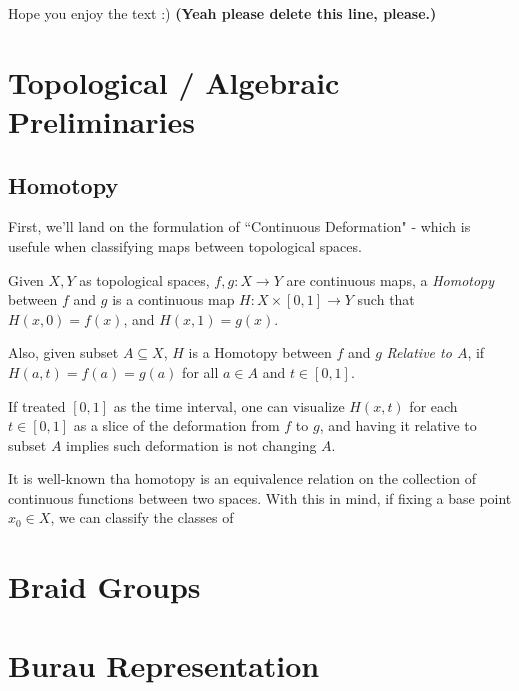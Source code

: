 \documentclass[x11names,reqno,12pt]{extarticle}
\begin{document}
Hope you enjoy the text :) \textbf{(Yeah please delete this line, please.)}

\section{Topological / Algebraic Preliminaries}
\subsection{Homotopy}
First, we'll land on the formulation of ``Continuous Deformation" - which is usefule when classifying maps between topological spaces.
\begin{defn}
  Given $X,Y$ as topological spaces, $f,g:X\rightarrow Y$ are continuous maps, a \emph{Homotopy} between $f$ and $g$ is a continuous map $H:X\times [0,1]\rightarrow Y$ such that $H(x,0)=f(x)$, and $H(x,1)=g(x)$.

  Also, given subset $A \subseteq X$, $H$ is a Homotopy between $f$ and $g$ \emph{Relative to $A$}, if $H(a,t) = f(a)=g(a)$ for all $a\in A$ and $t\in [0,1]$.
\end{defn}
If treated $[0,1]$ as the time interval, one can visualize $H(x,t)$ for each $t\in [0,1]$ as a slice of the deformation from $f$ to $g$, and having it relative to subset $A$ implies such deformation is not changing $A$. 

\hfil

It is well-known tha homotopy is an equivalence relation on the collection of continuous functions between two spaces. With this in mind, if fixing a base point $x_0 \in X$, we can classify the classes of 



\section{Braid Groups}

\section{Burau Representation}
\end{document}
